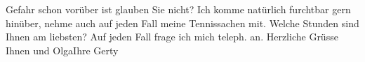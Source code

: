 \begin{ledgroupsized}[t]{13cm}
               Gefahr schon vorüber ist glauben Sie nicht?\pend
           \pstart
           Ich komme natürlich furchtbar gern hinüber, nehme auch auf jeden Fall meine
               Tennissachen mit. Welche Stunden sind Ihnen am liebsten?\pend
           \pstart
           Auf jeden Fall frage ich mich teleph. an.\pend
           \pstart Herzliche Grüsse Ihnen und Olga\hspace*{1.5em}Ihre \spacefill\mbox{Gerty}\pend{}
         
         \endnumbering{}\end{ledgroupsized}  \newcommand{\dateiname}{L01680}\newcommand{\titel}{Gerty von Hofmannsthal an Arthur Schnitzler, [29. 5. 1907]}\newcommand{\editorInnen}{Martin Anton Müller und Gerd-Hermann Susen}
      